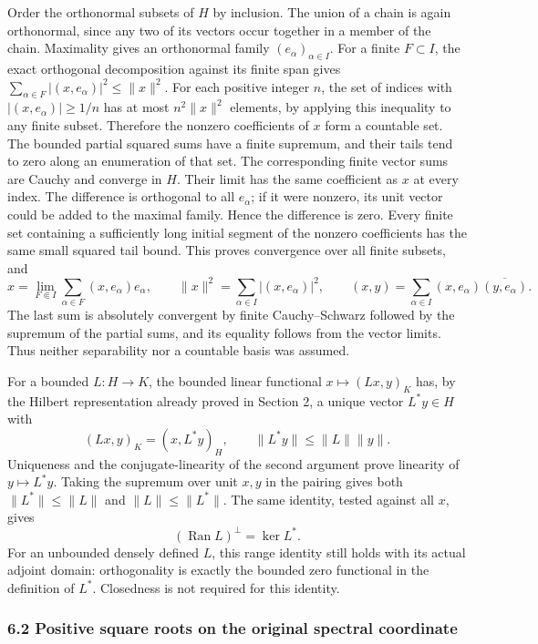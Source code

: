 \documentclass[
  11pt,
]{article}
\begin{document}
Order the orthonormal subsets of \(H\) by inclusion. The union of a
chain is again orthonormal, since any two of its vectors occur together
in a member of the chain. Maximality gives an orthonormal family
\((e_\alpha)_{\alpha\in I}\). For a finite \(F\subset I\), the exact
orthogonal decomposition against its finite span gives
\(\sum_{\alpha\in F}|(x,e_\alpha)|^2\leq\|x\|^2\). For each positive
integer \(n\), the set of indices with \(|(x,e_\alpha)|\geq1/n\) has at
most \(n^2\|x\|^2\) elements, by applying this inequality to any finite
subset. Therefore the nonzero coefficients of \(x\) form a countable
set. The bounded partial squared sums have a finite supremum, and their
tails tend to zero along an enumeration of that set. The corresponding
finite vector sums are Cauchy and converge in \(H\). Their limit has the
same coefficient as \(x\) at every index. The difference is orthogonal
to all \(e_\alpha\); if it were nonzero, its unit vector could be added
to the maximal family. Hence the difference is zero. Every finite set
containing a sufficiently long initial segment of the nonzero
coefficients has the same small squared tail bound. This proves
convergence over all finite subsets, and \[
 x=\lim_{F\Subset I}\sum_{\alpha\in F}(x,e_\alpha)e_\alpha,\qquad
 \|x\|^2=\sum_{\alpha\in I}|(x,e_\alpha)|^2,\qquad
 (x,y)=\sum_{\alpha\in I}(x,e_\alpha)\overline{(y,e_\alpha)} .
 \tag{HF3}
\] The last sum is absolutely convergent by finite Cauchy--Schwarz
followed by the supremum of the partial sums, and its equality follows
from the vector limits. Thus neither separability nor a countable basis
was assumed.

For a bounded \(L:H\to K\), the bounded linear functional
\(x\mapsto(Lx,y)_K\) has, by the Hilbert representation already proved
in Section 2, a unique vector \(L^*y\in H\) with \[
 (Lx,y)_K=(x,L^*y)_H,\qquad
 \|L^*y\|\leq\|L\|\|y\|.
 \tag{HF4}
\] Uniqueness and the conjugate-linearity of the second argument prove
linearity of \(y\mapsto L^*y\). Taking the supremum over unit \(x,y\) in
the pairing gives both \(\|L^*\|\leq\|L\|\) and \(\|L\|\leq\|L^*\|\).
The same identity, tested against all \(x\), gives \[
 (\operatorname{Ran}L)^\perp=\ker L^*.
 \tag{HF5}
\] For an unbounded densely defined \(L\), this range identity still
holds with its actual adjoint domain: orthogonality is exactly the
bounded zero functional in the definition of \(L^*\). Closedness is not
required for this identity.

\subsubsection{6.2 Positive square roots on the original spectral
coordinate}\label{positive-square-roots-on-the-original-spectral-coordinate}
\end{document}
